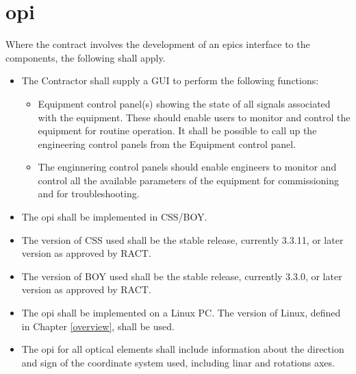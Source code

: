 \documentclass[11pt
  , a4paper
  , article
  , oneside
]{memoir}
\begin{document}
\section{\Gls{opi}}
Where the contract involves the development of an \Gls{epics} interface to the components, the following shall apply.
\begin{itemize}
\item The Contractor shall supply a GUI to perform the following functions:
  \begin{itemize}
  \item Equipment control panel(s) showing the state of all signals associated with the equipment. These should enable users to monitor and control the equipment for routine operation. It shall be possible to call up the engineering control panels from the Equipment control panel.
  \item The enginnering control panels should enable engineers to monitor and control all the available parameters of the equipment for commissioning and for troubleshooting.
  \end{itemize}
\item The \Gls{opi} shall be implemented in CSS/BOY.
\item The version of CSS used shall be the stable release, currently 3.3.11, or later version as approved by \Gls{RACT}.
\item The version of BOY used shall be the stable release, currently 3.3.0, or later version as approved by \Gls{RACT}.
\item The \Gls{opi} shall be implemented on a Linux PC. The version of Linux, defined in Chapter \ref{overview}, shall be used.
\item The \Gls{opi} for all optical elements shall include information about the direction and sign of the coordinate system used, including linar and rotations axes.

\end{itemize}
\end{document}
